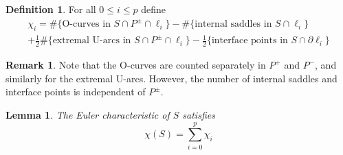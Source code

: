 \documentclass[12pt,reqno]{amsart}
\theoremstyle{plain}
\newtheorem{lemma}[theorem]{Lemma}
\theoremstyle{definition}
\newtheorem{definition}[theorem]{Definition}
\newtheorem{remark}[theorem]{Remark}
\newcommand{\bdy}{\partial}
\begin{document}
\begin{definition}
For all $0\le i\le p$ define 
\begin{multline}\label{eq: definition of chi_i}
\chi_i =
\#\{\text{O-curves in }S\cap P^\pm \cap \ell_i\}- \#\{\text{internal saddles in }S\cap\ell_i\}\\
+ \tfrac12\#\{\text{extremal U-arcs in }S\cap P^\pm\cap\ell_i\}  - \tfrac12\{\text{interface 
points in }S\cap \bdy\ell_i\}
\end{multline}
\end{definition}

\begin{remark}
Note that the O-curves are counted separately in $P^+$ and $P^-$, and similarly for the 
extremal U-arcs. However, the number of internal saddles and interface points is 
independent of $P^\pm$. 
\end{remark}

\begin{lemma}\label{euler by layer}
The Euler characteristic of $S$ satisfies
\[ \chi(S)= \sum_{i=0}^{p}\chi_i \]
\end{lemma}
\end{document}
